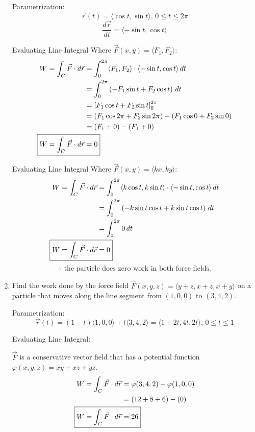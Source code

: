 \documentclass{article}
\begin{document}
\begin{enumerate}
Parametrization: 
    $$\Vec{r}(t)=\langle \cos t,\sin t\rangle,\,0\le t\le 2\pi$$
    $$\frac{d\Vec{r}}{dt}=\langle -\sin t, \cos t\rangle$$

Evaluating Line Integral Where $\Vec{F}(x,y)=\langle F_1,F_2\rangle$:
\begin{align*}
    W=\int_C \Vec{F}\cdot d\Vec{r}&=\int_0^{2\pi} \langle F_1,F_2\rangle \cdot \langle -\sin t, \cos t\rangle \,dt\\
    &= \int_0^{2\pi} \left(-F_1\sin t + F_2\cos t\right)\,dt\\
    &= \left[F_1\cos t + F_2\sin t\right]_0^{2\pi}\\
    &= \left(F_1\cos 2\pi + F_2\sin 2\pi\right)-\left(F_1\cos 0 + F_2\sin 0\right)\\
    &= \left(F_1 + 0\right)-\left(F_1+ 0\right)\\
    \Aboxed{W=\int_C \Vec{F}\cdot d\Vec{r}&=0}\\
\end{align*}

    Evaluating Line Integral Where $\Vec{F}(x,y)=\langle kx,ky\rangle$:
\begin{align*}
    W=\int_C \Vec{F}\cdot d\Vec{r}&=\int_0^{2\pi} \langle k\cos t,k\sin t\rangle \cdot \langle -\sin t, \cos t\rangle \,dt\\
    &= \int_0^{2\pi} \left(-k\sin t\cos t + k\sin t\cos t\right)\,dt\\
    &= \int_0^{2\pi} 0\,dt\\
    \Aboxed{W=\int_C \Vec{F}\cdot d\Vec{r}&=0}\\
\end{align*}    
$$\boxed{\therefore \text{ the particle does zero work in both force fields.}}$$
    \item Find the work done by the force field $\Vec{F}(x,y,z)=\langle y+z, x+z,x+y\rangle$ on a particle that moves along the line segment from $(1,0,0)$ to $(3,4,2)$.
    
Parametrization: 
    $$\Vec{r}(t)=(1-t)\langle 1,0,0\rangle +t\langle 3,4,2 \rangle=\langle 1+2t,4t,2t\rangle ,\, 0\le t\le 1$$
    
Evaluating Line Integral:

    $\Vec{F}$ is a conservative vector field that has a potential function $\varphi(x,y,z)=xy+xz+yz$.
    \begin{align*}
    W=\int_C \Vec{F}\cdot d\Vec{r}&=\varphi(3,4,2)-\varphi(1,0,0)\\
    &= (12+8+6)-(0)\\
\Aboxed{W=\int_C \Vec{F}\cdot d\Vec{r}&=26}\\
    \end{align*}


\end{enumerate}
\end{document}
